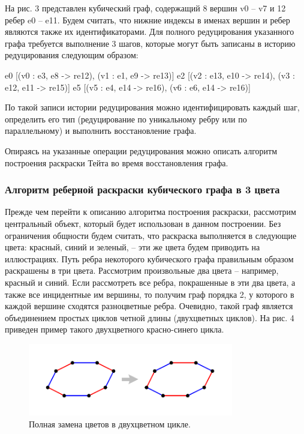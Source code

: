 На рис. 3 представлен кубический граф, содержащий 8 вершин v0 – v7 и 12 ребер e0 – e11. Будем считать, что нижние индексы в именах вершин и ребер являются также их идентификаторами.
Для полного редуцирования указанного графа требуется выполнение 3 шагов, которые могут быть записаны в историю редуцирования следующим образом:

e0 [(v0 : e3, e8 -> re12), (v1 : e1, e9 -> re13)]
e2 [(v2 : e13, e10 -> re14), (v3 : e12, e11 -> re15)]
e5 [(v5 : e4, e14 -> re16), (v6 : e6, e14 -> re16)]

По такой записи истории редуцирования можно идентифицировать каждый шаг, определить его тип (редуцирование по уникальному ребру или по параллельному) и выполнить восстановление графа.

Опираясь на указанные операции редуцирования можно описать алгоритм построения раскраски Тейта во время восстановления графа.

\subsubsection{Алгоритм реберной раскраски кубического графа в 3 цвета}

Прежде чем перейти к описанию алгоритма построения раскраски, рассмотрим центральный объект, который будет использован в данном построении. Без ограничения общности будем считать, что раскраска выполняется в следующие цвета: красный, синий и зеленый, – эти же цвета будем приводить на иллюстрациях.
Путь ребра некоторого кубического графа правильным образом раскрашены в три цвета.
Рассмотрим произвольные два цвета – например, красный и синий.
Если рассмотреть все ребра, покрашенные в эти два цвета, а также все инцидентные им вершины, то получим граф порядка 2, у которого в каждой вершине сходятся разноцветные ребра. Очевидно, такой граф является объединением простых циклов четной длины (двухцветных циклов).
На рис. 4 приведен пример такого двухцветного красно-синего цикла.

\begin{figure}[ht]
	\centering
		\includegraphics[width=0.8\textwidth]{./pics/text_3_edge_coloring/4-bicolor-cycle.pdf}
	\caption{Полная замена цветов в двухцветном цикле.}
	\label{fig:text_3_edge_coloring_4}
\end{figure}

